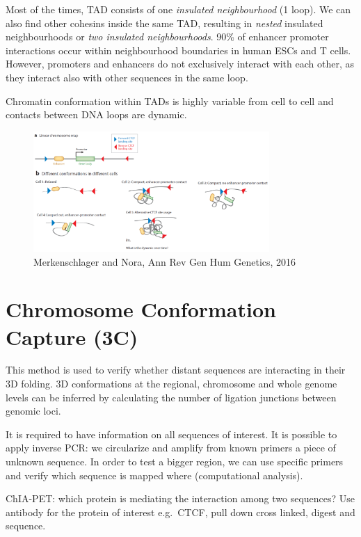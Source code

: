 Most of the times, TAD consists of one \emph{insulated neighbourhood} (1 loop). We can also find other cohesins inside the same TAD, resulting in \emph{nested} insulated neighbourhoods or \emph{two insulated neighbourhoods}. 90\% of enhancer promoter interactions occur within neighbourhood boundaries in human ESCs and T cells. However, promoters and enhancers do not exclusively interact with each other, as they interact also with other sequences in the same loop.

Chromatin conformation within TADs is highly variable from cell to cell and contacts between DNA loops are dynamic.

\begin{figure}
\centering
\includegraphics[width=0.8\textwidth]{../_resources/Screenshot_2022-10-19_at_08-48-41.png}
\caption{Merkenschlager and Nora, Ann Rev Gen Hum Genetics, 2016}
\end{figure}

\hypertarget{chromosome-conformation-capture-3c}{%
\section{Chromosome Conformation Capture (3C)}\label{chromosome-conformation-capture-3c}}

This method is used to verify whether distant sequences are interacting in their 3D folding. 3D conformations at the regional, chromosome and whole genome levels can be inferred by calculating the number of ligation junctions between genomic loci.

It is required to have information on all sequences of interest. It is possible to apply inverse PCR: we circularize and amplify from known primers a piece of unknown sequence. In order to test a bigger region, we can use specific primers and verify which sequence is mapped where (computational analysis).

ChIA-PET: which protein is mediating the interaction among two sequences? Use antibody for the protein of interest e.g.~CTCF, pull down cross linked, digest and sequence.


